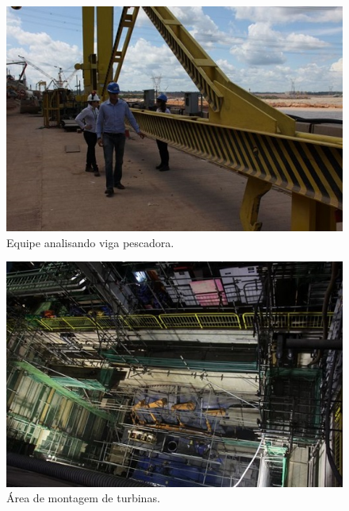 \begin{figure}[h!]
  \centering
  \includegraphics[width=1\linewidth]{Fotos/Novembro2013/3.jpg}
  \caption{Equipe analisando viga pescadora.}
  \label{nov20133}
\end{figure}

\begin{figure}[h!]
  \centering
  \includegraphics[width=1\linewidth]{Fotos/Novembro2013/4.jpg}
  \caption{Área de montagem de turbinas.}
  \label{nov20134}
\end{figure}
